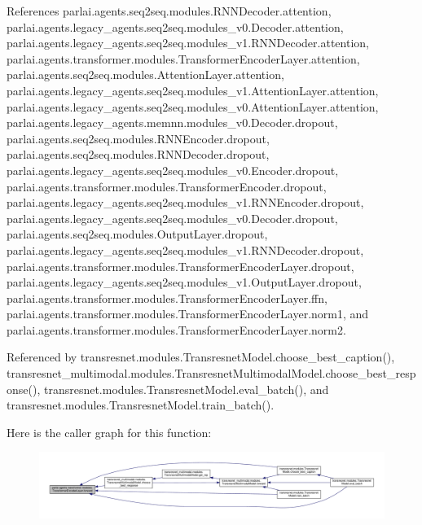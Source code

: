 References parlai.\+agents.\+seq2seq.\+modules.\+R\+N\+N\+Decoder.\+attention, parlai.\+agents.\+legacy\+\_\+agents.\+seq2seq.\+modules\+\_\+v0.\+Decoder.\+attention, parlai.\+agents.\+legacy\+\_\+agents.\+seq2seq.\+modules\+\_\+v1.\+R\+N\+N\+Decoder.\+attention, parlai.\+agents.\+transformer.\+modules.\+Transformer\+Encoder\+Layer.\+attention, parlai.\+agents.\+seq2seq.\+modules.\+Attention\+Layer.\+attention, parlai.\+agents.\+legacy\+\_\+agents.\+seq2seq.\+modules\+\_\+v1.\+Attention\+Layer.\+attention, parlai.\+agents.\+legacy\+\_\+agents.\+seq2seq.\+modules\+\_\+v0.\+Attention\+Layer.\+attention, parlai.\+agents.\+legacy\+\_\+agents.\+memnn.\+modules\+\_\+v0.\+Decoder.\+dropout, parlai.\+agents.\+seq2seq.\+modules.\+R\+N\+N\+Encoder.\+dropout, parlai.\+agents.\+seq2seq.\+modules.\+R\+N\+N\+Decoder.\+dropout, parlai.\+agents.\+legacy\+\_\+agents.\+seq2seq.\+modules\+\_\+v0.\+Encoder.\+dropout, parlai.\+agents.\+transformer.\+modules.\+Transformer\+Encoder.\+dropout, parlai.\+agents.\+legacy\+\_\+agents.\+seq2seq.\+modules\+\_\+v1.\+R\+N\+N\+Encoder.\+dropout, parlai.\+agents.\+legacy\+\_\+agents.\+seq2seq.\+modules\+\_\+v0.\+Decoder.\+dropout, parlai.\+agents.\+seq2seq.\+modules.\+Output\+Layer.\+dropout, parlai.\+agents.\+legacy\+\_\+agents.\+seq2seq.\+modules\+\_\+v1.\+R\+N\+N\+Decoder.\+dropout, parlai.\+agents.\+transformer.\+modules.\+Transformer\+Encoder\+Layer.\+dropout, parlai.\+agents.\+legacy\+\_\+agents.\+seq2seq.\+modules\+\_\+v1.\+Output\+Layer.\+dropout, parlai.\+agents.\+transformer.\+modules.\+Transformer\+Encoder\+Layer.\+ffn, parlai.\+agents.\+transformer.\+modules.\+Transformer\+Encoder\+Layer.\+norm1, and parlai.\+agents.\+transformer.\+modules.\+Transformer\+Encoder\+Layer.\+norm2.



Referenced by transresnet.\+modules.\+Transresnet\+Model.\+choose\+\_\+best\+\_\+caption(), transresnet\+\_\+multimodal.\+modules.\+Transresnet\+Multimodal\+Model.\+choose\+\_\+best\+\_\+response(), transresnet.\+modules.\+Transresnet\+Model.\+eval\+\_\+batch(), and transresnet.\+modules.\+Transresnet\+Model.\+train\+\_\+batch().

Here is the caller graph for this function\+:
\nopagebreak
\begin{figure}[H]
\begin{center}
\leavevmode
\includegraphics[width=350pt]{classparlai_1_1agents_1_1transformer_1_1modules_1_1TransformerEncoderLayer_aba0474eb3a08b6c482648adc0804776e_icgraph}
\end{center}
\end{figure}


